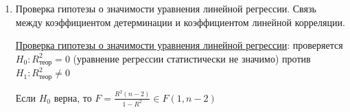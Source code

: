 \begin{enumerate}
    \Defs $D(\hat \varepsilon) = \frac{1}{n} \sum_{i = 1}^n (\hat \varepsilon_i)^2$ -- дисперсия остатков

    Так как $X = \hat X + \hat \varepsilon$, $\cov (\hat X, \hat \varepsilon) = 0$, то $D(X) = D(\hat X) + D(\hat \varepsilon) + 2\cov (\hat X, \hat \varepsilon) = D(\hat X) + D(\hat \varepsilon)$

    \begin{MyTheorem}
        \Ths $D(X) = D(\hat X) + D(\hat \varepsilon)$
    \end{MyTheorem}

    Очевидно, что качество модели будет тем лучше, чем меньше будет дисперсия остатков

    \Def Коэффициентом детерминации $R^2$ называется величина $R^2 = \frac{D(\hat X)}{D(X)}$ или $R^2 = 1 - \frac{D(\hat \varepsilon)}{D(X)}$

    \Notas Смысл $R^2$ -- доля объясненной дисперсии, а $1 - R^2$ -- доля необъясненной дисперсии

    Свойства: 

    \begin{enumerate}
        \item $0 \leq R^2 \leq 1$
        \item Если $R^2 = 1$, то $D(\hat \varepsilon) = 0 \Longrightarrow \hat \varepsilon_i = \overline{\hat \varepsilon_i} = 0$, то есть точки лежат строго на 
        линии регрессии, модель идеальна

        \item Если $R^2 = 0$, то $D(\hat X) = 0 \Longrightarrow \hat X = \overline{x}$, то есть получаем примитивную, ничего не объясняющую модель
    \end{enumerate}

    Чем больше $R^2$, тем лучше качество модели

    \item Проверка гипотезы о значимости уравнения линейной регрессии. Связь между коэффициентом детерминации и коэффициентом линейной корреляции.

    \hyperlink{linear_regression_hypothesis}{Проверка гипотезы о значимости уравнения линейной регрессии}: проверяется $H_0 : R^2_\text{теор} = 0$ (уравнение регрессии статистически не значимо) против $H_1 : R^2_\text{теор} \neq 0$

    \begin{MyTheorem}
        \Ths Если $H_0$ верна, то $F = \frac{R^2 (n - 2)}{1 - R^2} \in F(1, n - 2)$
    \end{MyTheorem}


\end{enumerate}
